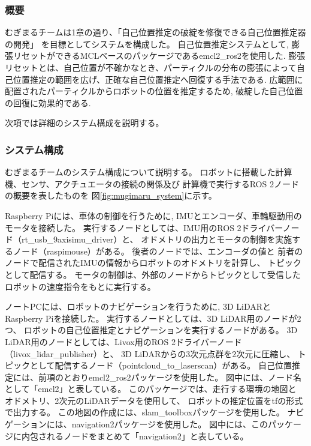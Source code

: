 \subsubsection{概要}
むぎまるチームは1章の通り、「自己位置推定の破綻を修復できる自己位置推定器の開発」
を目標としてシステムを構成した。
自己位置推定システムとして, 膨張リセット\cite{ueda2004iros}ができるMCLベースのパッケージであるemcl2\_ros2\cite{emcl2_ros2}を使用した. 
膨張リセットとは、自己位置が不確かなとき、パーティクルの分布の膨張によって自己位置推定の範囲を広げ、正確な自己位置推定へ回復する手法である. 
広範囲に配置されたパーティクルからロボットの位置を推定するため, 破綻した自己位置の回復に効果的である. 

次項では詳細のシステム構成を説明する。
\subsubsection{システム構成}
むぎまるチームのシステム構成について説明する。
ロボットに搭載した計算機、センサ、アクチュエータの接続の関係及び
計算機で実行するROS 2ノードの概要を表したものを
図\ref{fig:mugimaru_system}に示す。

Raspberry Piには、車体の制御を行うために, IMUとエンコーダ、車輪駆動用のモータを接続した。
実行するノードとしては、IMU用のROS 2ドライバーノード（rt\_usb\_9axisimu\_driver）と、
オドメトリの出力とモータの制御を実施するノード（raspimouse）がある。
後者のノードでは、エンコーダの値と
前者のノードで配信されたIMUの情報からロボットのオドメトリを計算し、
トピックとして配信する。
モータの制御は、外部のノードからトピックとして受信した
ロボットの速度指令をもとに実行する。

ノートPCには、ロボットのナビゲーションを行うために, 3D LiDARとRaspberry Piを接続した。
実行するノードとしては、3D LiDAR用のノードが2つ、
ロボットの自己位置推定とナビゲーションを実行するノードがある。
3D LiDAR用のノードとしては、Livox用のROS 2ドライバーノード（livox\_lidar\_publisher）と、
3D LiDARからの3次元点群を2次元に圧縮し、
トピックとして配信するノード（pointcloud\_to\_laserscan）がある。
自己位置推定には、前項のとおりemcl2\_ros2パッケージ\cite{emcl2_ros2}を使用した。
図中には、ノード名として「emcl2」と表している。
このパッケージでは、走行する環境の地図と
オドメトリ、2次元のLiDARデータを使用して、
ロボットの推定位置をtfの形式で出力する。
この地図の作成には、slam\_toolboxパッケージ\cite{slam_toolbox}を使用した。
ナビゲーションには、navigation2パッケージ\cite{nav2}を使用した。
図中には、このパッケージに内包されるノードをまとめて「navigation2」と表している。

